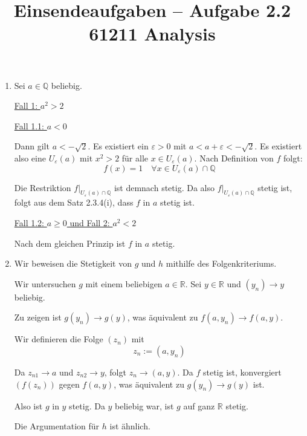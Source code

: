 \documentclass[a4paper,12pt]{article}
\title{Einsendeaufgaben -- Aufgabe 2.2\\[0.5em]
\large 61211 Analysis}
\author{}
\date{}
\begin{document}
\maketitle

\begin{enumerate}[label=\alph*)]
    \setcounter{enumi}{0}
    \item

          Sei $a \in \mathbb{Q}$ beliebig.

          \bigskip

          \underline{Fall 1: $a^2 > 2$}

          \underline{Fall 1.1: $a < 0$}

          Dann gilt $a < -\sqrt{2}$. Es existiert ein $\varepsilon > 0$ mit $a < a + \varepsilon < -\sqrt{2}$. Es existiert also eine $U_\varepsilon(a)$ mit $x^2 > 2$ für alle $x \in U_\varepsilon(a)$.
          Nach Definition von $f$ folgt:
          \[
              f(x) = 1 \quad \forall x \in U_\varepsilon(a) \cap \mathbb{Q}
          \]

          Die Restriktion $f|_{U_\varepsilon(a) \cap \mathbb{Q}}$ ist demnach stetig.
          Da also $f|_{U_\varepsilon(a) \cap \mathbb{Q}}$ stetig ist, folgt aus dem Satz 2.3.4(i), dass $f$ in $a$ stetig ist.

          \bigskip

          \underline{Fall 1.2: $a \geq 0$ und Fall 2: $a^2 < 2$}

          Nach dem gleichen Prinzip ist $f$ in $a$ stetig.

          \bigskip

    \item

          Wir beweisen die Stetigkeit von $g$ und $h$ mithilfe des Folgenkriteriums.

          Wir untersuchen $g$ mit einem beliebigen $a \in \mathbb{R}$. Sei $y \in \mathbb{R}$ und $(y_n) \to y$ beliebig.

          Zu zeigen ist $g(y_n) \to g(y)$, was äquivalent zu $f(a, y_n) \to f(a, y)$.

          Wir definieren die Folge $(z_n)$ mit
          \[
              z_n := (a, y_n)
          \]

          Da $z_{n1} \to a$ und $z_{n2} \to y$, folgt $z_n \to (a, y)$. Da $f$ stetig ist, konvergiert $(f(z_n))$ gegen $f(a, y)$, was äquivalent zu $g(y_n) \to g(y)$ ist.

          Also ist $g$ in $y$ stetig. Da $y$ beliebig war, ist $g$ auf ganz $\mathbb{R}$ stetig.

          \bigskip

          Die Argumentation für $h$ ist ähnlich.

\end{enumerate}
\end{document}
